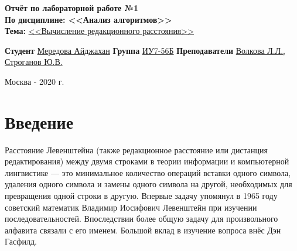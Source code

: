 \documentclass[a4paper]{article}
\begin{document}
\begin{titlepage}
		\vspace{30mm}
		\begin{center}
		\textbf{Отчёт по лабораторной работе №1}\\
		{\bf	По дисциплине: <<Анализ алгоритмов>>}\\
		{\bf Тема:} \underline {<<Вычисление редакционного расстояния>>}\\
		\end{center}
		\begin{flushleft}
			{\bf Студент}  \underline{Мередова Айджахан}\underline {\hspace{7cm}}
			\newline
			{\bf Группа} \underline{ИУ7-56Б}\underline {\hspace{10cm}}
			\newline
			{\bf Преподаватели} \underline {Волкова Л.Л., Строганов Ю.В.}
		\end{flushleft}

		\vfill
		
		\centering Москва - 2020 г.\\
	\end{titlepage}

	\section*{Введение}Расстояние Левенштейна (также редакционное расстояние или дистанция редактирования) между двумя строками в теории информации и компьютерной лингвистике — это минимальное количество операций вставки одного символа, удаления одного символа и замены одного символа на другой, необходимых для превращения одной строки в другую.
	Впервые задачу упомянул в 1965 году советский математик Владимир Иосифович Левенштейн при изучении последовательностей. Впоследствии более общую задачу для произвольного алфавита связали с его именем. Большой вклад в изучение вопроса внёс Дэн Гасфилд.
\end{document}
